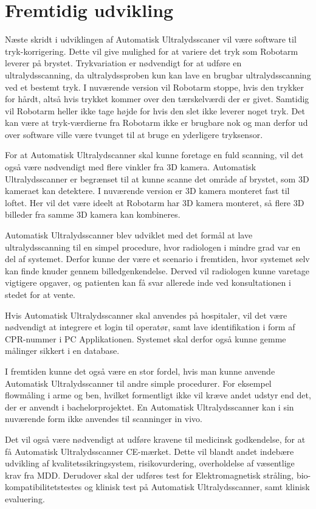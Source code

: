 \chapter{Fremtidig udvikling}\label{kapitel_Fremtidig udvikling}

Næste skridt i udviklingen af Automatisk Ultralydsscaner vil være software til tryk-korrigering.
Dette vil give mulighed for at variere det tryk som Robotarm leverer på brystet. Trykvariation er nødvendigt for at udføre en ultralydsscanning, da ultralydssproben kun kan lave en brugbar ultralydsscanning ved et bestemt tryk. 
I nuværende version vil Robotarm stoppe, hvis den trykker for hårdt, altså hvis trykket kommer over den tærskelværdi der er givet. Samtidig vil Robotarm heller ikke tage højde for hvis den slet ikke leverer noget tryk.
Det kan være at tryk-værdierne fra Robotarm ikke er brugbare nok og man derfor ud over software ville være tvunget til at bruge en yderligere tryksensor.

For at Automatisk Ultralydscanner skal kunne foretage en fuld scanning, vil det også være nødvendigt med flere vinkler fra 3D kamera. Automatisk Ultralydsscanner er begrænset til at kunne scanne det område af brystet, som 3D kameraet kan detektere. I nuværende version er 3D kamera monteret fast til loftet. Her vil det være ideelt at Robotarm har 3D kamera monteret, så flere 3D billeder fra samme 3D kamera kan kombineres.

Automatisk Ultralydsscanner blev udviklet med det formål at lave ultralydsscanning til en simpel procedure, hvor radiologen i mindre grad var en del af systemet. Derfor kunne der være et scenario i fremtiden, hvor systemet selv kan finde knuder gennem billedgenkendelse. Derved vil radiologen kunne varetage vigtigere opgaver, og patienten kan få svar allerede inde ved konsultationen i stedet for at vente.

Hvis Automatisk Ultralydsscanner skal anvendes på hospitaler, vil det være nødvendigt at integrere et login til operatør, samt lave identifikation i form af CPR-nummer i PC Applikationen. Systemet skal derfor også kunne gemme målinger sikkert i en database. 

I fremtiden kunne det også være en stor fordel, hvis man kunne anvende Automatisk Ultralydsscanner til andre simple procedurer. For eksempel flowmåling i arme og ben, hvilket formentligt ikke vil kræve andet udstyr end det, der er anvendt i bachelorprojektet. En Automatisk Ultralydsscanner kan i sin nuværende form ikke anvendes til scanninger in vivo.

Det vil også være nødvendigt at udføre kravene til medicinsk godkendelse, for at få Automatisk Ultralydsscanner CE-mærket. Dette vil blandt andet indebære udvikling af kvalitetssikringsystem, risikovurdering, overholdelse af væsentlige krav fra MDD. Derudover skal der udføres test for Elektromagnetisk stråling, bio-kompatibilitetstestes og klinisk test på Automatisk Ultralydsscanner, samt klinisk evaluering. 
